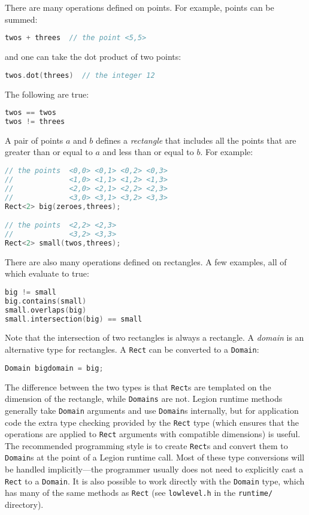 There are many operations defined on points.  For example, points can be summed:
\begin{lstlisting}[language=C++,style=inline]
twos + threes  // the point <5,5>
\end{lstlisting}
and one can take the dot product of two points:             
\begin{lstlisting}[language=C++,style=inline]
twos.dot(threes)  // the integer 12
\end{lstlisting}
The following are true:
\begin{lstlisting}[language=C++,style=inline]
twos == twos   
twos != threes 
\end{lstlisting}
A pair of points $a$ and $b$ defines a {\em rectangle} that includes all the points that are greater than or equal to $a$
and less than or equal to $b$.  For example:
\begin{lstlisting}[language=C++,style=inline]
// the points  <0,0> <0,1> <0,2> <0,3> 
//             <1,0> <1,1> <1,2> <1,3>
//             <2,0> <2,1> <2,2> <2,3>
//             <3,0> <3,1> <3,2> <3,3>
Rect<2> big(zeroes,threes);  

// the points  <2,2> <2,3>
//             <3,2> <3,3>
Rect<2> small(twos,threes);
\end{lstlisting}
There are also many operations defined on rectangles.  A few examples, all of which evaluate to true:
\begin{lstlisting}[language=C++,style=inline]
big != small                       
big.contains(small)                
small.overlaps(big)                
small.intersection(big) == small   
\end{lstlisting}
Note that the intersection of two rectangles is always a rectangle.
A {\em domain} is an alternative type for rectangles.  A {\tt Rect} can be converted to a {\tt Domain}:
\begin{lstlisting}[language=C++,style=inline]
Domain bigdomain = big;
\end{lstlisting}
The difference between the two types is that {\tt Rect}s are templated on the dimension of the rectangle, while {\tt Domains}
are not.  Legion runtime methods generally take {\tt Domain} arguments and use {\tt Domain}s internally, but for application
code the extra type checking provided by the {\tt Rect} type (which ensures that the operations are applied to {\tt Rect} arguments
with compatible dimensions) is useful.  The recommended programming style is to create {\tt Rect}s and convert them to {\tt Domain}s
at the point of a Legion runtime call.  Most of these type conversions will be handled implicitly---the programmer usually does not need to explicitly cast
a {\tt Rect} to a {\tt Domain}. It is also possible to work directly with the {\tt Domain} type, which has many
of the same methods as {\tt Rect} (see {\tt lowlevel.h} in the {\tt runtime/} directory).

